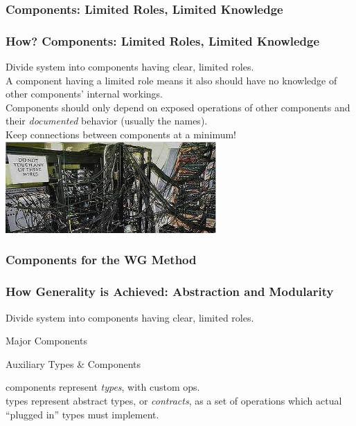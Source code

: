 \documentclass{beamer}
\begin{document}
\subsubsection{Components: Limited Roles, Limited Knowledge}

\begin{frame}
  \frametitle{How? Components: Limited Roles, Limited Knowledge}
  Divide system into components having clear, limited roles.
  \pause
   \raisebox{3mm}{$\implies$} \\
  A component having a limited role means it also should have no knowledge of other components' internal workings.\\
  \pause
  Components should only depend on exposed operations of other components and their \emph{documented} behavior (usually the names).\\
  \pause
  Keep connections between components at a minimum!
  \includegraphics[height=3.5cm]{crazy-wiring.jpg}
\end{frame}

\subsubsection{Components for the WG Method}

\begin{frame}
  \frametitle{How Generality is Achieved: Abstraction and Modularity}
  Divide system into components having clear, limited roles.\\
  \pause
  \begin{block}{Major Components}
  \end{block}
  \pause
  \begin{block}{Auxiliary Types \& Components}
  \end{block}
  \pause
   components represent \emph{types}, with custom ops.\\
  \pause
   types represent abstract
  types, or \emph{contracts}, as a set of operations which actual ``plugged in'' types must implement.
\end{frame}
\end{document}
